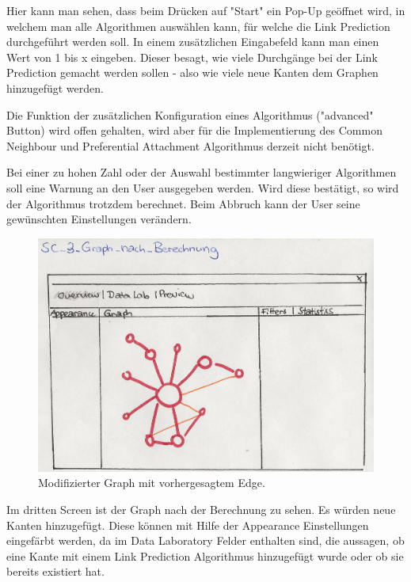 Hier kann man sehen, dass beim Drücken auf "Start" ein Pop-Up geöffnet wird, in welchem man alle Algorithmen auswählen
kann, für welche die Link Prediction durchgeführt werden soll. In einem zusätzlichen Eingabefeld kann man einen Wert
von 1 bis x eingeben. Dieser besagt, wie viele Durchgänge bei der Link Prediction gemacht werden sollen - also wie viele
neue Kanten dem Graphen hinzugefügt werden.

Die Funktion der zusätzlichen Konfiguration eines Algorithmus ("advanced" Button) wird offen gehalten, wird aber für die
Implementierung des Common Neighbour und Preferential Attachment Algorithmus derzeit nicht benötigt.

Bei einer zu hohen Zahl oder der Auswahl bestimmter langwieriger Algorithmen soll eine Warnung an den User ausgegeben
werden. Wird diese bestätigt, so wird der Algorithmus trotzdem berechnet. Beim Abbruch kann der User seine gewünschten
Einstellungen verändern.

\begin{figure}[htbp]
    \includegraphics[width=\linewidth]{resources/SC-3.png}
    \caption{Modifizierter Graph mit vorhergesagtem Edge.}
    \label{fig:screen3}
\end{figure}

Im dritten Screen ist der Graph nach der Berechnung zu sehen. Es würden neue Kanten hinzugefügt. Diese können mit Hilfe
der Appearance Einstellungen eingefärbt werden, da im Data Laboratory Felder enthalten sind, die aussagen, ob eine
Kante mit einem Link Prediction Algorithmus hinzugefügt wurde oder ob sie bereits existiert hat.

